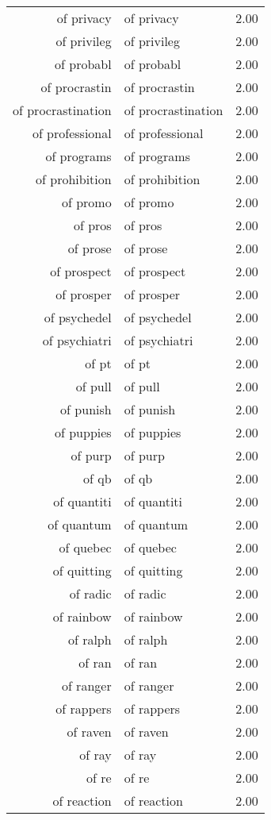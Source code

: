 \begin{table}[ht]
\begin{tabular}{rlr}
  of privacy & of privacy & 2.00 \\ 
  of privileg & of privileg & 2.00 \\ 
  of probabl & of probabl & 2.00 \\ 
  of procrastin & of procrastin & 2.00 \\ 
  of procrastination & of procrastination & 2.00 \\ 
  of professional & of professional & 2.00 \\ 
  of programs & of programs & 2.00 \\ 
  of prohibition & of prohibition & 2.00 \\ 
  of promo & of promo & 2.00 \\ 
  of pros & of pros & 2.00 \\ 
  of prose & of prose & 2.00 \\ 
  of prospect & of prospect & 2.00 \\ 
  of prosper & of prosper & 2.00 \\ 
  of psychedel & of psychedel & 2.00 \\ 
  of psychiatri & of psychiatri & 2.00 \\ 
  of pt & of pt & 2.00 \\ 
  of pull & of pull & 2.00 \\ 
  of punish & of punish & 2.00 \\ 
  of puppies & of puppies & 2.00 \\ 
  of purp & of purp & 2.00 \\ 
  of qb & of qb & 2.00 \\ 
  of quantiti & of quantiti & 2.00 \\ 
  of quantum & of quantum & 2.00 \\ 
  of quebec & of quebec & 2.00 \\ 
  of quitting & of quitting & 2.00 \\ 
  of radic & of radic & 2.00 \\ 
  of rainbow & of rainbow & 2.00 \\ 
  of ralph & of ralph & 2.00 \\ 
  of ran & of ran & 2.00 \\ 
  of ranger & of ranger & 2.00 \\ 
  of rappers & of rappers & 2.00 \\ 
  of raven & of raven & 2.00 \\ 
  of ray & of ray & 2.00 \\ 
  of re & of re & 2.00 \\ 
  of reaction & of reaction & 2.00 \\ 

\end{tabular}
\end{table}
